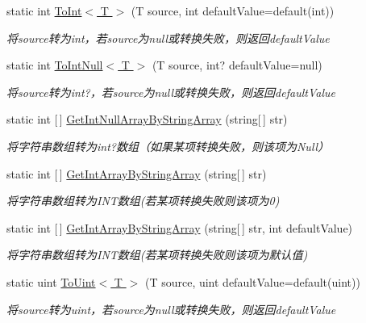 \begin{DoxyCompactItemize}
static int \hyperlink{class_x_c_l_net_tools_1_1_common_1_1_data_type_convert_a0153e442c6d2a0ba381bf25dfef5cfb2}{To\+Int$<$ T $>$} (T source, int default\+Value=default(int))
\begin{DoxyCompactList}\small\item\em 将source转为int，若source为null或转换失败，则返回default\+Value \end{DoxyCompactList}\item 
static int \hyperlink{class_x_c_l_net_tools_1_1_common_1_1_data_type_convert_aaad571f931d166628e81452a709dcc38}{To\+Int\+Null$<$ T $>$} (T source, int? default\+Value=null)
\begin{DoxyCompactList}\small\item\em 将source转为int?，若source为null或转换失败，则返回default\+Value \end{DoxyCompactList}\item 
static int \mbox{[}$\,$\mbox{]} \hyperlink{class_x_c_l_net_tools_1_1_common_1_1_data_type_convert_ac3f26d844001e5094f02dc70ed10c3f5}{Get\+Int\+Null\+Array\+By\+String\+Array} (string\mbox{[}$\,$\mbox{]} str)
\begin{DoxyCompactList}\small\item\em 将字符串数组转为int?数组（如果某项转换失败，则该项为\+Null） \end{DoxyCompactList}\item 
static int \mbox{[}$\,$\mbox{]} \hyperlink{class_x_c_l_net_tools_1_1_common_1_1_data_type_convert_a4989f3ee0b2b95175ce7229c8e75a68a}{Get\+Int\+Array\+By\+String\+Array} (string\mbox{[}$\,$\mbox{]} str)
\begin{DoxyCompactList}\small\item\em 将字符串数组转为\+I\+N\+T数组(若某项转换失败则该项为0) \end{DoxyCompactList}\item 
static int \mbox{[}$\,$\mbox{]} \hyperlink{class_x_c_l_net_tools_1_1_common_1_1_data_type_convert_ae22c68e54a576fc1093ca3555789331c}{Get\+Int\+Array\+By\+String\+Array} (string\mbox{[}$\,$\mbox{]} str, int default\+Value)
\begin{DoxyCompactList}\small\item\em 将字符串数组转为\+I\+N\+T数组(若某项转换失败则该项为默认值) \end{DoxyCompactList}\item 
static uint \hyperlink{class_x_c_l_net_tools_1_1_common_1_1_data_type_convert_af6d9ff6103f191d91f38cfda562c25aa}{To\+Uint$<$ T $>$} (T source, uint default\+Value=default(uint))
\begin{DoxyCompactList}\small\item\em 将source转为uint，若source为null或转换失败，则返回default\+Value \end{DoxyCompactList}\item 

\end{DoxyCompactItemize}
